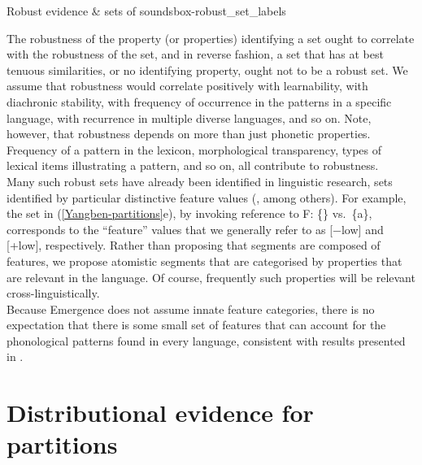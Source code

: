 \begin{dadpbox}{Robust evidence \& sets of sounds}{box-robust_set_labels}

The robustness of the property (or properties) identifying a set ought to correlate with the robustness of the set, and in reverse fashion, a set that has at best  tenuous similarities, or  no identifying property, ought not to be a robust set.  We assume that robustness would correlate positively with learnability, with diachronic stability, with frequency of occurrence in the patterns in a specific language, with recurrence in multiple diverse languages, and so on. Note, however, that robustness depends on more than just phonetic properties. Frequency of a pattern in the lexicon, morphological transparency, types of lexical items illustrating a pattern, and so on, all contribute to robustness.\\

Many such robust sets have already been identified in linguistic research, sets identified by particular distinctive feature values (\citealt{Jakobson+:1954, Chomsky+:1968, Clements+:1995}, among others). For example,  the set in (\ref{Yangben-partitions}e), by invoking reference to F: \{\} vs.\ \{a\}, corresponds to the ``feature'' values that we generally refer to as [$-$low] and [+low], respectively. Rather than proposing that segments are composed of features, we propose atomistic segments that are categorised by properties that are relevant in the language. Of course, frequently such properties will be relevant cross-linguistically.\\

Because Emergence does not assume innate feature categories, there is no expectation that there is some small set of features that can account for the phonological patterns found in every language, consistent with results presented in \citet{Mielke:2008}. 
\end{dadpbox}

\section{Distributional evidence for partitions}\label{intro-partitions-sec} 

